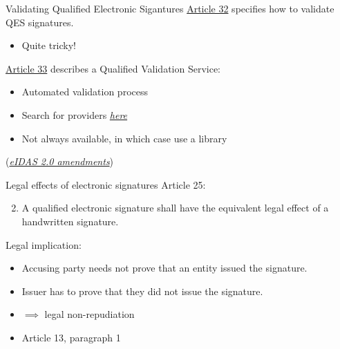 \begin{frame}{Validating Qualified Electronic Sigantures}
  \href{https://eur-lex.europa.eu/legal-content/EN/TXT/HTML/?uri=CELEX\%3A32014R0910\#d1e2594-73-1}{Article 32} specifies how to validate QES signatures.
  \begin{itemize}[<+(1)->]
    \item Quite tricky!
  \end{itemize}

  \vspace*{1em}

  \pause
  \href{https://eur-lex.europa.eu/legal-content/EN/TXT/HTML/?uri=CELEX:32014R0910\#d1e2664-73-1}{Article 33} describes a Qualified Validation Service:
  \begin{itemize}
    \item Automated validation process
    \item Search for providers \href{https://eidas.ec.europa.eu/efda/trust-services/browse/eidas/tls/search/type?step=1}{\textit{here}}
    \item Not always available, in which case use a library
  \end{itemize}

  \vspace*{1em}

  \pause
  (\href{https://eur-lex.europa.eu/legal-content/EN/TXT/HTML/?uri=OJ:L\_202401183\#d1e3370-1-1}{\textit{eIDAS 2.0 amendments}})
\end{frame}

\begin{frame}{Legal effects of electronic signatures}
  \pause
  Article 25:
  \begin{enumerate}
    \setcounter{enumi}{1}
    \item A qualified electronic signature shall have the equivalent legal effect of a handwritten signature.
  \end{enumerate}

  \vspace*{1em}

  \pause
  Legal implication:
  \begin{itemize}[<+(1)->]
    \item Accusing party needs not prove that an entity issued the signature.
    \item Issuer has to prove that they did not issue the signature.
    \item $\implies$ legal non-repudiation
    \item Article 13, paragraph 1
  \end{itemize}
\end{frame}

